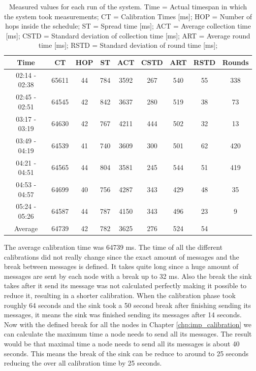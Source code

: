 \begin{table}[htbp]
 \caption{Measured values for each run of the system. Time = Actual timespan in which the system took measurements; CT = Calibration Times [ms]; HOP = Number of hops inside the schedule; ST = Spread time [ms]; ACT = Average collection time [ms]; CSTD = Standard deviation of collection time [ms]; ART = Average round time [ms]; RSTD = Standard deviation of round time [ms];}
 \centering
 \begin{tabular}{c||c|c|c|c|c|c|c|c}
  Time & CT & HOP & ST & ACT & CSTD & ART & RSTD & Rounds\\ \toprule
  02:14 - 02:38 & 65611 & 44 & 784 & 3592 & 267 & 540 & 55 & 338\\
  02:45 - 02:51 & 64545 & 42 & 842 & 3637 & 280 & 519 & 38 & 73\\
  03:17 - 03:19 & 64630 & 42 & 767 & 4211 & 444 & 502 & 32 & 13\\
  03:49 - 04:19 & 64539 & 41 & 740 & 3609 & 300 & 501 & 62 & 420\\
  04:21 - 04:51 & 64565 & 44 & 804 & 3581 & 245 & 544 & 51 & 419\\
  04:53 - 04:57 & 64699 & 40 & 756 & 4287 & 343 & 429 & 48 & 35\\
  05:24 - 05:26 & 64587 & 44 & 787 & 4150 & 343 & 496 & 23 & 9\\ \toprule
  Average & 64739 & 42 & 782 & 3625 & 276 & 524 & 54 & \\
 \end{tabular}
 \label{tab:NightTable}
\end{table}

The average calibration time was 64739 ms. The time of all the different calibrations did not really change since the exact amount of messages and the break between messages is defined. It takes quite long since a huge amount of messages are sent by each node with a break up to 32 ms. Also the break the sink takes after it send its message was not calculated perfectly making it possible to reduce it, resulting in a shorter calibration. When the calibration phase took roughly 64 seconds and the sink took a 50 second break after finishing sending its messages, it means the sink was finished sending its messages after 14 seconds. Now with the defined break for all the nodes in Chapter \ref{chp:imp_calibration} we can calculate the maximum time a node needs to send all its messages. The result would be that maximal time a node needs to send all its messages is about 40 seconds. This means the break of the sink can be reduce to around to 25 seconds reducing the over all calibration time by 25 seconds.

